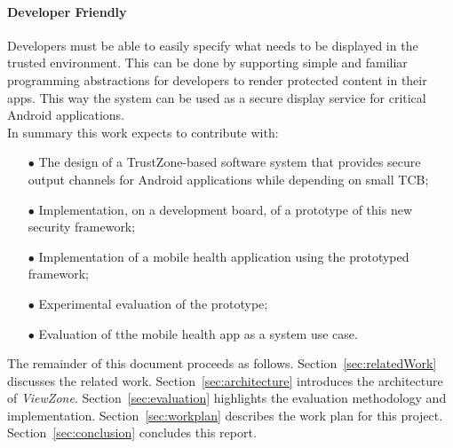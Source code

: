 \paragraph*{\textbf{Developer Friendly\\}} Developers must be able to easily specify what needs to be displayed in the trusted environment. This can be done by supporting simple and familiar programming abstractions for developers to render protected content in their apps. This way the system can be used as a secure display service for critical Android applications.\\


In summary this work expects to contribute with:
\begin{itemize}
	\item[$\bullet$] The design of a TrustZone-based software system that provides secure output channels for Android applications while depending on small TCB;
	\item[$\bullet$] Implementation, on a development board, of a prototype of this new security framework;
	\item[$\bullet$] Implementation of a mobile health application using the prototyped framework;
	\item[$\bullet$] Experimental evaluation of the prototype;
	\item[$\bullet$] Evaluation of tthe mobile health app as a system use case.
\end{itemize}

%
The remainder of this document proceeds as follows. Section~\ref{sec:relatedWork} discusses the related work. Section~\ref{sec:architecture} introduces the architecture of \emph{ViewZone}. Section~\ref{sec:evaluation} highlights the evaluation methodology and implementation. Section~\ref{sec:workplan} describes the work plan for this project. Section~\ref{sec:conclusion} concludes this report.